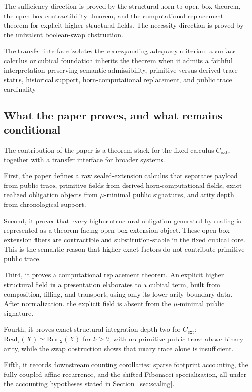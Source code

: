 \documentclass{lmcs}
\begin{document}
The sufficiency direction is proved by the structural horn-to-open-box theorem,
the open-box contractibility theorem, and the computational replacement theorem
for explicit higher structural fields.  The necessity direction is proved by the
univalent boolean-swap obstruction.

The transfer interface isolates the corresponding adequacy criterion: a surface
calculus or cubical foundation inherits the theorem when it admits a faithful
interpretation preserving semantic admissibility, primitive-versus-derived trace
status, historical support, horn-computational replacement, and public trace
cardinality.


\subsection{What the paper proves, and what remains conditional}

The contribution of the paper is a theorem stack for the fixed calculus
\(C_{\mathrm{ext}}\), together with a transfer interface for broader systems.

First, the paper defines a raw sealed-extension calculus that separates payload
from public trace, primitive fields from derived horn-computational fields, exact
realized obligation objects from \(\mu\)-minimal public signatures, and arity
depth from chronological support.

Second, it proves that every higher structural obligation generated by sealing is
represented as a theorem-facing open-box extension object.  These open-box
extension fibers are contractible and substitution-stable in the fixed cubical
core.  This is the semantic reason that higher exact factors do not contribute
primitive public trace.

Third, it proves a computational replacement theorem.  An explicit higher
structural field in a presentation elaborates to a cubical term, built from
composition, filling, and transport, using only its lower-arity boundary data.
After normalization, the explicit field is absent from the \(\mu\)-minimal public
signature.

Fourth, it proves exact structural integration depth two for \(C_{\mathrm{ext}}\):
\(\mathrm{Real}_k(X) \simeq \mathrm{Real}_2(X)\) for \(k\geq 2\), with no
primitive public trace above binary arity, while the swap obstruction shows that
unary trace alone is insufficient.

Fifth, it records downstream counting corollaries: sparse footprint accounting,
the fully coupled affine recurrence, and the shifted Fibonacci specialization,
all under the accounting hypotheses stated in Section~\ref{sec:scaling}.
\end{document}

